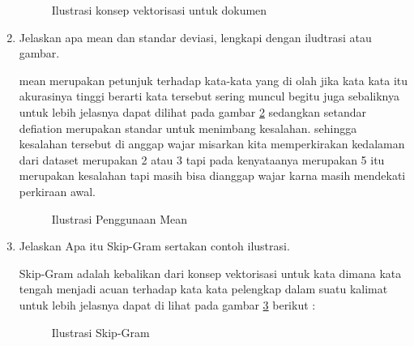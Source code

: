 \begin{enumerate}
\begin{figure}[!htbp]
      \caption{Ilustrasi konsep vektorisasi untuk dokumen}
      \label{c74}
      \end{figure}

\item Jelaskan apa mean dan standar deviasi, lengkapi dengan iludtrasi atau gambar. \par
mean merupakan petunjuk terhadap kata-kata yang di olah jika kata kata itu akurasinya tinggi berarti kata tersebut sering muncul begitu juga sebaliknya untuk lebih jelasnya dapat dilihat pada gambar \ref{c75} sedangkan setandar defiation merupakan standar untuk menimbang kesalahan. sehingga kesalahan tersebut di anggap wajar misarkan kita memperkirakan kedalaman dari dataset merupakan 2 atau 3 tapi pada kenyataanya merupakan 5 itu merupakan kesalahan tapi masih bisa dianggap wajar karna masih mendekati perkiraan awal.

\begin{figure}[!htbp]
      \caption{Ilustrasi Penggunaan Mean}
      \label{c75}
      \end{figure}

\item Jelaskan Apa itu Skip-Gram sertakan contoh ilustrasi. \par
Skip-Gram adalah kebalikan dari konsep vektorisasi untuk kata dimana kata tengah menjadi acuan terhadap kata kata pelengkap dalam suatu kalimat untuk lebih jelasnya dapat di lihat pada gambar \ref{c76} berikut :

\begin{figure}[!htbp]
      \caption{Ilustrasi Skip-Gram}
      \label{c76}
      \end{figure}

\end{enumerate}
